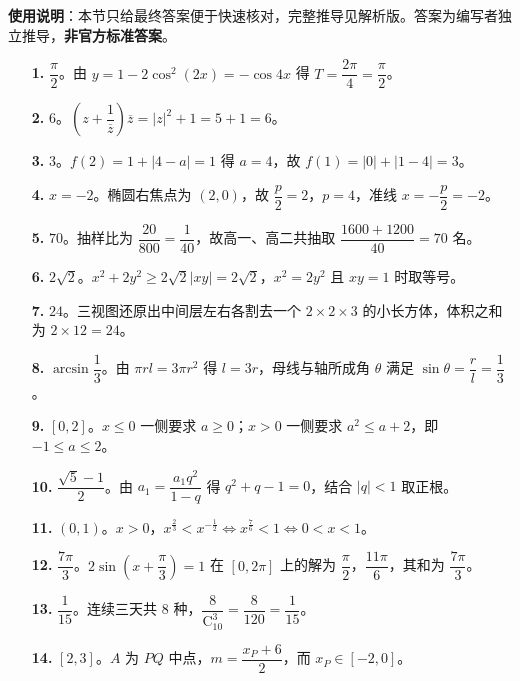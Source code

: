 
\begin{gknotice}
\textbf{使用说明}：本节只给最终答案便于快速核对，完整推导见解析版。答案为编写者独立推导，\textbf{非官方标准答案}。
\end{gknotice}

\begin{itemize}[leftmargin=2.6em]
  \item[\textbf{1.}] $\dfrac\pi2$。由 $y=1-2\cos^2(2x)=-\cos4x$ 得 $T=\dfrac{2\pi}4=\dfrac\pi2$。
  \item[\textbf{2.}] $6$。$\left(z+\dfrac1{\overline z}\right)\overline z=|z|^2+1=5+1=6$。
  \item[\textbf{3.}] $3$。$f(2)=1+|4-a|=1$ 得 $a=4$，故 $f(1)=|0|+|1-4|=3$。
  \item[\textbf{4.}] $x=-2$。椭圆右焦点为 $(2,0)$，故 $\dfrac p2=2$，$p=4$，准线 $x=-\dfrac p2=-2$。
  \item[\textbf{5.}] $70$。抽样比为 $\dfrac{20}{800}=\dfrac1{40}$，故高一、高二共抽取 $\dfrac{1600+1200}{40}=70$ 名。
  \item[\textbf{6.}] $2\sqrt2$。$x^2+2y^2\geqslant2\sqrt2|xy|=2\sqrt2$，$x^2=2y^2$ 且 $xy=1$ 时取等号。
  \item[\textbf{7.}] $24$。三视图还原出中间层左右各割去一个 $2\times2\times3$ 的小长方体，体积之和为 $2\times12=24$。
  \item[\textbf{8.}] $\arcsin\dfrac13$。由 $\pi rl=3\pi r^2$ 得 $l=3r$，母线与轴所成角 $\theta$ 满足 $\sin\theta=\dfrac rl=\dfrac13$。
  \item[\textbf{9.}] $[0,2]$。$x\leqslant0$ 一侧要求 $a\geqslant0$；$x>0$ 一侧要求 $a^2\leqslant a+2$，即 $-1\leqslant a\leqslant2$。
  \item[\textbf{10.}] $\dfrac{\sqrt5-1}{2}$。由 $a_1=\dfrac{a_1q^2}{1-q}$ 得 $q^2+q-1=0$，结合 $|q|<1$ 取正根。
  \item[\textbf{11.}] $(0,1)$。$x>0$，$x^{\frac23}<x^{-\frac12}\iff x^{\frac76}<1\iff0<x<1$。
  \item[\textbf{12.}] $\dfrac{7\pi}3$。$2\sin\left(x+\dfrac\pi3\right)=1$ 在 $[0,2\pi]$ 上的解为 $\dfrac\pi2$，$\dfrac{11\pi}6$，其和为 $\dfrac{7\pi}3$。
  \item[\textbf{13.}] $\dfrac1{15}$。连续三天共 $8$ 种，$\dfrac8{\mathrm C_{10}^3}=\dfrac8{120}=\dfrac1{15}$。
  \item[\textbf{14.}] $[2,3]$。$A$ 为 $PQ$ 中点，$m=\dfrac{x_P+6}2$，而 $x_P\in[-2,0]$。
\end{itemize}

